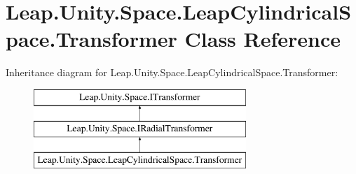 \hypertarget{class_leap_1_1_unity_1_1_space_1_1_leap_cylindrical_space_1_1_transformer}{}\section{Leap.\+Unity.\+Space.\+Leap\+Cylindrical\+Space.\+Transformer Class Reference}
\label{class_leap_1_1_unity_1_1_space_1_1_leap_cylindrical_space_1_1_transformer}
Inheritance diagram for Leap.\+Unity.\+Space.\+Leap\+Cylindrical\+Space.\+Transformer\+:\begin{figure}[H]
\begin{center}
\leavevmode
\includegraphics[height=3.000000cm]{class_leap_1_1_unity_1_1_space_1_1_leap_cylindrical_space_1_1_transformer}
\end{center}
\end{figure}
